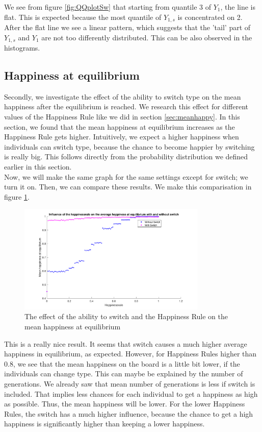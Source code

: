 We see from figure \ref{fig:QQplotSw} that starting from quantile 3 of $Y_1$, the line is flat. This is expected because the most quantile of $Y_{1,s}$ is concentrated on 2. After the flat line we see a linear pattern, which suggests that the 'tail' part of $Y_{1,s}$ and $Y_1$ are not too differently distributed. This can be also observed in the histograms.

\subsection{Happiness at equilibrium}

Secondly, we investigate the effect of the ability to switch type on the mean happiness after the equilibrium is reached.
We research this effect for different values of the Happiness Rule like we did in section \ref{sec:meanhappy}.
In this section, we found that the mean happiness at equilibrium increases as the Happiness Rule gets higher.
Intuitively, we expect a higher happiness when individuals can switch type, because the chance to become happier by switching is really big.
This follows directly from the probability distribution we defined earlier in this section.\\

Now, we will make the same graph for the same settings except for switch; we turn it on. 
Then, we can compare these results.
We make this comparisation in figure \ref{fig:meanhappyswitch}.

\begin{figure}[H]
    \centering
    \includegraphics[width=0.8\textwidth]{happinessrule-meanhappiness-switch.pdf}
    \caption{The effect of the ability to switch and the Happiness Rule on the mean happiness at equilibrium}
    \label{fig:meanhappyswitch}
\end{figure}

This is a really nice result.
It seems that switch causes a much higher average happiness in equilibrium, as expected.
However, for Happiness Rules higher than $0.8$, we see that the mean happiness on the board is a little bit lower, if the individuals can change type.
This can maybe be explained by the number of generations.
We already saw that mean number of generations is less if switch is included.
That implies less chances for each individual to get a happiness as high as possible.
Thus, the mean happiness will be lower.
For the lower Happiness Rules, the switch has a much higher influence, because the chance to get a high happiness is significantly higher than keeping a lower happiness.

